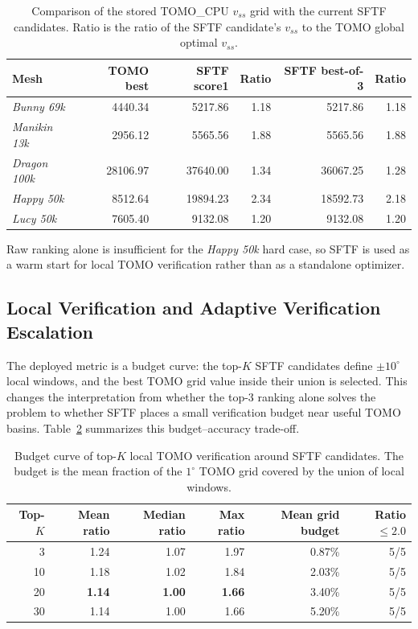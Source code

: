 \documentclass[11pt,a4paper]{article}
\begin{document}
\begin{table}[H]
\centering
\caption{Comparison of the stored TOMO\_CPU $v_{ss}$ grid with the current SFTF candidates.
Ratio is the ratio of the SFTF candidate's $v_{ss}$ to the TOMO global optimal $v_{ss}$.}
\label{tab:sftf-tomo-comparison}
\begin{tabular}{lrrrrr}
\toprule
Mesh & TOMO best & SFTF score1 & Ratio & SFTF best-of-3 & Ratio\\
\midrule
\emph{Bunny 69k} & 4440.34 & 5217.86 & 1.18 & 5217.86 & 1.18\\
\emph{Manikin 13k} & 2956.12 & 5565.56 & 1.88 & 5565.56 & 1.88\\
\emph{Dragon 100k} & 28106.97 & 37640.00 & 1.34 & 36067.25 & 1.28\\
\emph{Happy 50k} & 8512.64 & 19894.23 & 2.34 & 18592.73 & 2.18\\
\emph{Lucy 50k} & 7605.40 & 9132.08 & 1.20 & 9132.08 & 1.20\\
\bottomrule
\end{tabular}
\end{table}

Raw ranking alone is insufficient for the \emph{Happy 50k} hard case, so SFTF is used as a warm start for local TOMO verification rather than as a standalone optimizer.

\subsection{Local Verification and Adaptive Verification Escalation}
\label{sec:budget-curve}
\label{sec:ave}

The deployed metric is a budget curve: the top-$K$ SFTF candidates define $\pm10^\circ$ local windows, and the best TOMO grid value inside their union is selected. This changes the interpretation from whether the top-3 ranking alone solves the problem to whether SFTF places a small verification budget near useful TOMO basins. Table~\ref{tab:budget-curve} summarizes this budget--accuracy trade-off.

\begin{table}[H]
\centering
\caption{Budget curve of top-$K$ local TOMO verification around SFTF candidates.
The budget is the mean fraction of the $1^\circ$ TOMO grid covered by the union of local windows.}
\label{tab:budget-curve}
\begin{tabular}{rrrrrr}
\toprule
Top-$K$ & Mean ratio & Median ratio & Max ratio & Mean grid budget & Ratio $\le 2.0$\\
\midrule
3  & 1.24 & 1.07 & 1.97 & 0.87\% & 5/5\\
10 & 1.18 & 1.02 & 1.84 & 2.03\% & 5/5\\
20 & \textbf{1.14} & \textbf{1.00} & \textbf{1.66} & 3.40\% & 5/5\\
30 & 1.14 & 1.00 & 1.66 & 5.20\% & 5/5\\
\bottomrule
\end{tabular}
\end{table}
\end{document}
